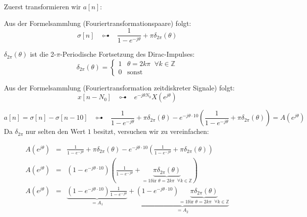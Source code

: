 \begin{uebsp}
\begin{Answer}
\begin{enumerate}[a)]
                Zuerst transformieren wir $a[n]$:
                \begin{uebsp_theory}
                    Aus der Formelsammlung (Fouriertransformationspaare) folgt:
                    \[\sigma[n]\;\;\;\multimapdotbothA\;\;\;\frac{1}{1-e^{-j\theta}}+\pi\delta_{2\pi}(\theta)\]
                \end{uebsp_theory}
                \begin{uebsp_theory}
                    $\delta_{2\pi}(\theta)$ ist die 2-$\pi$-Periodische
                    Fortsetzung des Dirac-Impulses:
                \[\delta_{2\pi}(\theta)=\begin{cases}1& \theta=2k\pi\;\;\forall k\in\mathbb{Z}\\0
                                                      &\text{sonst}\end{cases}\]
                \end{uebsp_theory}
               \begin{uebsp_theory}
                    Aus der Formelsammlung (Fouriertransformation zeitdiskreter
                    Signale) folgt:
                    \[x[n-N_0]\;\;\;\multimapdotbothA\;\;\;e^{-j\theta N_0}X\left(e^{j\theta}\right)\]
                \end{uebsp_theory}
                \[a[n]=\sigma[n]-\sigma[n-10]\;\;\;\multimapdotbothA\;\;\;\frac{1}{1-e^{-j\theta}}+\pi\delta_{2\pi}(\theta)-e^{-j\theta\cdot
                10}\left(\frac{1}{1-e^{-j\theta}}+\pi\delta_{2\pi}(\theta)\right)=A\left(e^{j\theta}\right)\]
                Da $\delta_{2\pi}$ nur selten den Wert $1$ besitzt, versuchen
                wir zu vereinfachen:

                \begin{eqnarray*}
                    A\left(e^{j\theta}\right)&=&\frac{1}{1-e^{-j\theta}}+\pi\delta_{2\pi}(\theta)-e^{-j\theta\cdot
                        10}\left(\frac{1}{1-e^{-j\theta}}+\pi\delta_{2\pi}(\theta)\right)\\
                        A\left(e^{j\theta}\right)&=&\left(1-e^{-j\theta\cdot
                10}\right)\left(\frac{1}{1-e^{-j\theta}}+\underbrace{\pi\delta_{2\pi}(\theta)}_{=1\text{
                für }\theta=2k\pi\;\;\forall k\in\mathbb{Z}}\right)\\
                A\left(e^{j\theta}\right)&=&\underbrace{\left(1-e^{-j\theta\cdot
    10}\right)\frac{1}{1-e^{-j\theta}}}_{=A_1}+\underbrace{\left(1-e^{-j\theta\cdot
                10}\right)\underbrace{\pi\delta_{2\pi}(\theta)}_{=1\text{
            für }\theta=2k\pi\;\;\forall k\in\mathbb{Z}}}_{=A_2}
                \end{eqnarray*}


\end{enumerate}
\end{Answer}
\end{uebsp}
